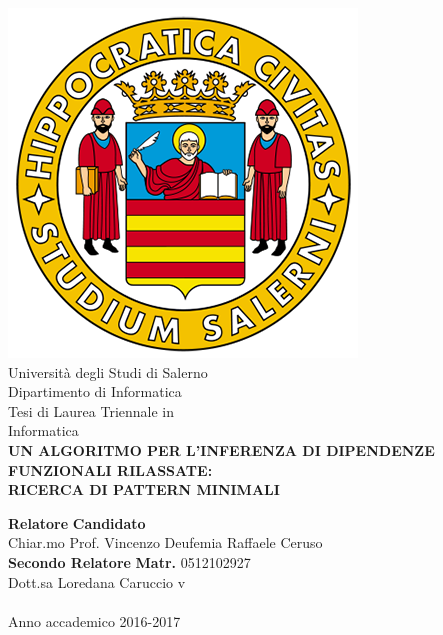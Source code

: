 \begin{center}
    \includegraphics[scale = 0.30]{Immagini/logoUnisa.png}\\
    \vspace{1cm}
    {\Large Università degli Studi di Salerno}\\[0.2truecm]
    {\large Dipartimento di Informatica}\\
    \hrulefill
    \vfill
    {\large Tesi di Laurea Triennale in }\\[0.2truecm]
    {\Large Informatica}\\
  
    \vfill
    {\large \bf UN ALGORITMO PER L'INFERENZA
    	DI DIPENDENZE FUNZIONALI RILASSATE:\\ 
        RICERCA DI PATTERN MINIMALI
    }
    \vfill\vfill
   
    
    {\bf Relatore} \hfill {\bf Candidato} 
    \\
    Chiar.mo Prof. Vincenzo Deufemia \hfill Raffaele Ceruso \\
    \vfill
    {\bf Secondo Relatore}
    \hfill {\bf Matr.} 0512102927\\
    
    
    Dott.sa Loredana Caruccio  \hfill {\phantom v} \\
    \vspace{1cm}
    \hrulefill \\
    \vspace{1cm}
    Anno accademico 2016-2017
   
\end{center}